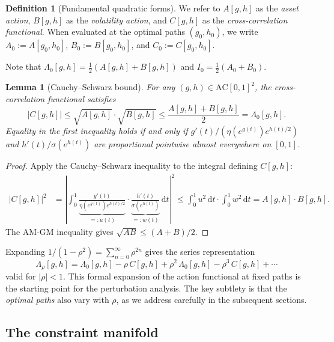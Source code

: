 \documentclass[11pt]{article}
\newtheorem{lemma}[theorem]{Lemma}
\theoremstyle{definition}
\newtheorem{definition}[theorem]{Definition}
\newcommand{\dd}{\mathrm{d}}
\newcommand{\AC}{\mathrm{AC}}
\begin{document}
\begin{definition}[Fundamental quadratic forms]\label{def:ABC}
We refer to $A[g,h]$ as the \emph{asset action}, $B[g,h]$ as the \emph{volatility action}, and $C[g,h]$ as the \emph{cross-correlation functional}. When evaluated at the optimal paths $(g_0, h_0)$, we write $A_0 := A[g_0, h_0]$, $B_0 := B[g_0, h_0]$, and $C_0 := C[g_0, h_0]$.
\end{definition}

Note that $\Lambda_0[g,h] = \frac{1}{2}(A[g,h] + B[g,h])$ and $I_0 = \frac{1}{2}(A_0 + B_0)$.

\begin{lemma}[Cauchy--Schwarz bound]\label{lem:CS}
For any $(g,h) \in \AC[0,1]^2$, the cross-correlation functional satisfies
\begin{equation}\label{eq:CS_bound}
  |C[g,h]| \leq \sqrt{A[g,h]}\cdot\sqrt{B[g,h]} \leq \frac{A[g,h] + B[g,h]}{2} = \Lambda_0[g,h].
\end{equation}
Equality in the first inequality holds if and only if $g'(t)/(\eta(e^{g(t)})e^{h(t)/2})$ and $h'(t)/\sigma(e^{h(t)})$ are proportional pointwise almost everywhere on $[0,1]$.
\end{lemma}

\begin{proof}
Apply the Cauchy--Schwarz inequality to the integral defining $C[g,h]$:
\begin{align}
  |C[g,h]|^2 &= \left|\int_0^1 \underbrace{\frac{g'(t)}{\eta(e^{g(t)})e^{h(t)/2}}}_{=: u(t)} \cdot \underbrace{\frac{h'(t)}{\sigma(e^{h(t)})}}_{=: w(t)}\,\dd t\right|^2 \leq \int_0^1 u^2\,\dd t \cdot \int_0^1 w^2\,\dd t = A[g,h]\cdot B[g,h].
\end{align}
The AM-GM inequality gives $\sqrt{AB} \leq (A+B)/2$.
\end{proof}

Expanding $1/(1-\rho^2) = \sum_{n=0}^\infty \rho^{2n}$ gives the series representation
\begin{equation}\label{eq:series}
  \Lambda_\rho[g,h] = \Lambda_0[g,h] - \rho\,C[g,h] + \rho^2\,\Lambda_0[g,h] - \rho^3\,C[g,h] + \cdots
\end{equation}
valid for $|\rho| < 1$. This formal expansion of the action functional at fixed paths is the starting point for the perturbation analysis. The key subtlety is that the \emph{optimal paths} also vary with $\rho$, as we address carefully in the subsequent sections.

\subsection{The constraint manifold}\label{sec:constraint}
\end{document}
